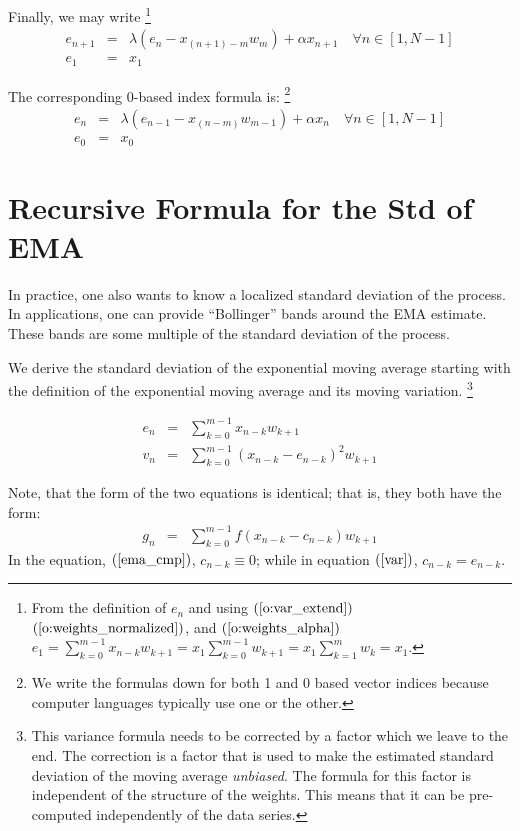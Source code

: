 \documentclass{article}
\begin{document}
Finally, we may write%
\footnote{From the definition of $e_n$ and using 
	$(\ref{o:var_extend})$ $(\ref{o:weights_normalized})$, and $(\ref{o:weights_alpha})$
$e_1 = \sum_{k=0}^{m-1} x_{n-k} w_{k+1} = x_1 \sum_{k=0}^{m-1} w_{k+1} = x_1 \sum_{k=1}^m w_k = x_1$.}
\begin{eqnarray}
    e_{n+1} &=&  \lambda \left(e_n - x_{(n+1) - m} w_m \right) + \alpha x_{n+1} \quad \forall n \in [1, N-1] \\
    e_1     &=&  x_1 
\end{eqnarray}

The corresponding 0-based index formula is:%
\footnote{We write the formulas down for both 1 and  0 based vector indices because
computer languages typically use one or the other.}
\begin{eqnarray}
    e_{n} &=&  \lambda \left( e_{n-1} - x_{(n-m)} w_{m-1} \right) + \alpha x_{n}  \quad \forall n \in [1, N-1] \\
    e_0   &=&  x_0 
\end{eqnarray}

\section{Recursive Formula for the Std of EMA}
In practice, one also wants to know a localized standard deviation of the process.
In applications, one can provide ``Bollinger'' bands around the EMA estimate.
These bands are some multiple of the standard deviation of the process.

We derive the standard deviation of the exponential moving average starting
with the definition of the exponential moving average and its moving variation.%
\footnote{This variance formula needs to be corrected by a factor which we 
leave to the end. The correction is a factor that is used to make the 
estimated standard deviation of the moving average {\em unbiased\/}.
The formula for this factor is independent of the structure of the weights.
This means that it can be pre-computed independently of the data series.}

\begin{eqnarray}
    e_n &=&  \sum_{k=0}^{m-1} x_{n-k} w_{k+1} \label{ema_cmp} \\
    v_n &=&  \sum_{k=0}^{m-1} (x_{n-k} - e_{n-k})^2 w_{k+1}  \label{var} 
\end{eqnarray}

Note, that the form of the two equations is identical; that is, 
they both have the form:
\begin{eqnarray}
	g_n &=& \sum_{k=0}^{m-1} f(x_{n-k} - c_{n-k}) w_{k+1} 
\end{eqnarray}
In the equation, $(\ref{ema_cmp})$, $c_{n-k} \equiv 0$; while in equation 
$(\ref{var})$, $c_{n-k} = e_{n-k}$.
\end{document}
